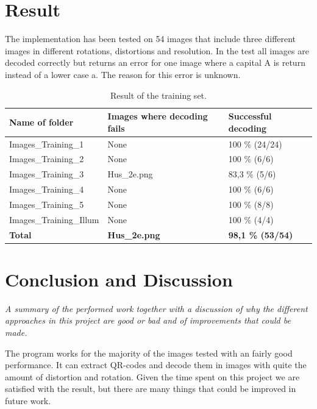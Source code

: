 \documentclass[12pt,a4paper]{article}
\begin{document}
\section{Result}
The implementation has been tested on 54 images that include three different images in different rotations, distortions and resolution. In the test all images are decoded correctly but returns an error for one image where a capital A is return instead of a lower case a. The reason for this error is unknown.
\begin{table}
    \begin{tabular}{|l|l|l|}
    \hline
    \textbf{Name of folder}          & \textbf{Images where decoding fails} & \textbf{Successful decoding} \\ \hline
    Images\_Training\_1     & None                        & 100 \% (24/24)      \\ \hline
    Images\_Training\_2     & None                        & 100 \% (6/6)        \\ \hline
    Images\_Training\_3     & Hus\_2e.png                 & 83,3 \% (5/6)       \\ \hline
    Images\_Training\_4     & None                        & 100 \% (6/6)        \\ \hline
    Images\_Training\_5     & None                        & 100 \% (8/8)        \\ \hline
    Images\_Training\_Illum & None                        & 100 \% (4/4)        \\ \hline
    \textbf{Total}                   & \textbf{Hus\_2e.png }                & \textbf{98,1 \% (53/54)}     \\ \hline
    \end{tabular}
    \caption{\label{tab:result}Result of the training set.}
\end{table}

\section{Conclusion and Discussion}
\textit{A summary of the performed work together with a discussion of why the different approaches in this project are good or bad and of improvements that could be made.} 

The program works for the majority of the images tested with an fairly good performance. 
It can extract QR-codes and decode them in images with quite the amount of distortion and rotation. Given the time spent on this project we are satisfied with the result, but there are many things that could be improved in future work.
\end{document}
